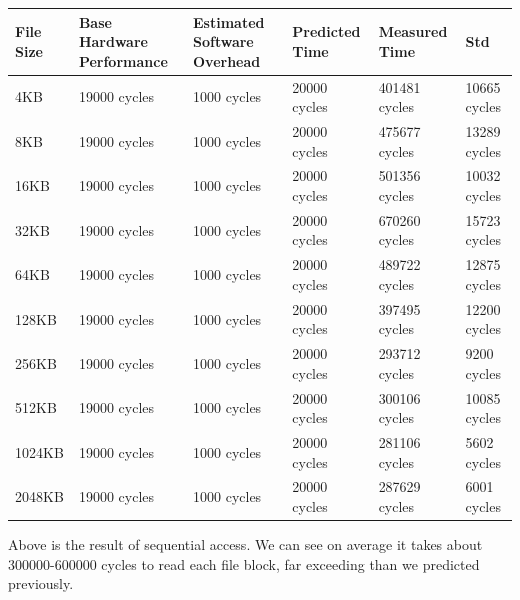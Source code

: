 \begin{center}
\begin{tabular}{| p{2cm} | p{2.5cm} | p{2.5cm} | p{2.5cm} | p{2.5cm} | p{3cm}}
File Size &  Base Hardware Performance  & Estimated Software Overhead  & Predicted Time  & Measured Time & Std  \\

\hline
4KB & 19000 cycles& 1000 cycles& 20000 cycles& 401481 cycles & 10665 cycles \\ 
8KB & 19000 cycles& 1000 cycles& 20000 cycles& 475677 cycles & 13289 cycles \\ 
16KB & 19000 cycles& 1000 cycles& 20000 cycles& 501356 cycles & 10032 cycles \\
32KB & 19000 cycles& 1000 cycles& 20000 cycles& 670260 cycles & 15723 cycles \\
64KB & 19000 cycles& 1000 cycles& 20000 cycles& 489722 cycles & 12875 cycles \\
128KB & 19000 cycles& 1000 cycles& 20000 cycles& 397495 cycles & 12200 cycles \\
256KB & 19000 cycles& 1000 cycles& 20000 cycles& 293712 cycles & 9200 cycles \\
512KB & 19000 cycles& 1000 cycles& 20000 cycles& 300106 cycles &  10085 cycles \\
1024KB & 19000 cycles& 1000 cycles& 20000 cycles& 281106 cycles & 5602 cycles \\
2048KB & 19000 cycles& 1000 cycles& 20000 cycles& 287629 cycles & 6001 cycles \\

\end{tabular}
\end{center}

Above is the result of sequential access. We can see on average it takes about 300000-600000 cycles to read each file block, far exceeding than we predicted previously.

